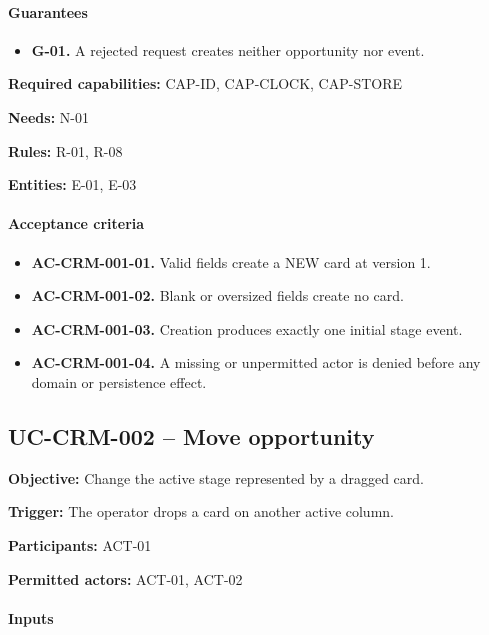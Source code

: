 \documentclass[10pt,a4paper]{article}
\begin{document}
\paragraph{Guarantees}

\begin{itemize}

\item \textbf{G-01.} A rejected request creates neither opportunity nor event.

\end{itemize}

\textbf{Required capabilities:} CAP-ID, CAP-CLOCK, CAP-STORE

\textbf{Needs:} N-01

\textbf{Rules:} R-01, R-08

\textbf{Entities:} E-01, E-03

\paragraph{Acceptance criteria}

\begin{itemize}

\item \textbf{AC-CRM-001-01.} Valid fields create a NEW card at version 1.

\item \textbf{AC-CRM-001-02.} Blank or oversized fields create no card.

\item \textbf{AC-CRM-001-03.} Creation produces exactly one initial stage event.

\item \textbf{AC-CRM-001-04.} A missing or unpermitted actor is denied before any domain or persistence effect.

\end{itemize}

\subsection{UC-CRM-002 -- Move opportunity}

\textbf{Objective:} Change the active stage represented by a dragged card.

\textbf{Trigger:} The operator drops a card on another active column.

\textbf{Participants:} ACT-01

\textbf{Permitted actors:} ACT-01, ACT-02

\paragraph{Inputs}
\end{document}
